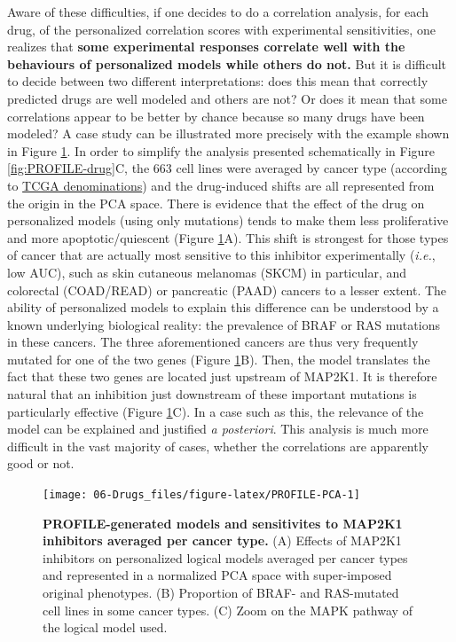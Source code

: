 \documentclass[a4paper,12pt,twoside,onecolumn,openright,final,oldfontcommands]{memoir}
\begin{document}
Aware of these difficulties, if one decides to do a correlation
analysis, for each drug, of the personalized correlation scores with
experimental sensitivities, one realizes that \textbf{some experimental
responses correlate well with the behaviours of personalized models
while others do not.} But it is difficult to decide between two
different interpretations: does this mean that correctly predicted drugs
are well modeled and others are not? Or does it mean that some
correlations appear to be better by chance because so many drugs have
been modeled? A case study can be illustrated more precisely with the
example shown in Figure \ref{fig:PROFILE-PCA}. In order to simplify the
analysis presented schematically in Figure \ref{fig:PROFILE-drug}C, the
663 cell lines were averaged by cancer type (according to
\href{https://gdc.cancer.gov/resources-tcga-users/tcga-code-tables/tcga-study-abbreviations}{TCGA
denominations}) and the drug-induced shifts are all represented from the
origin in the PCA space. There is evidence that the effect of the drug
on personalized models (using only mutations) tends to make them less
proliferative and more apoptotic/quiescent (Figure
\ref{fig:PROFILE-PCA}A). This shift is strongest for those types of
cancer that are actually most sensitive to this inhibitor experimentally
(\emph{i.e.}, low AUC), such as skin cutaneous melanomas (SKCM) in
particular, and colorectal (COAD/READ) or pancreatic (PAAD) cancers to a
lesser extent. The ability of personalized models to explain this
difference can be understood by a known underlying biological reality:
the prevalence of BRAF or RAS mutations in these cancers. The three
aforementioned cancers are thus very frequently mutated for one of the
two genes (Figure \ref{fig:PROFILE-PCA}B). Then, the model translates
the fact that these two genes are located just upstream of MAP2K1. It is
therefore natural that an inhibition just downstream of these important
mutations is particularly effective (Figure \ref{fig:PROFILE-PCA}C). In
a case such as this, the relevance of the model can be explained and
justified \emph{a posteriori}. This analysis is much more difficult in
the vast majority of cases, whether the correlations are apparently good
or not.

\begin{figure}

{\centering \texttt{[image: 06-Drugs\_files/figure-latex/PROFILE-PCA-1]} 

}

\caption[PROFILE-generated models and sensitivites to MAP2K1  inhibitors averaged per cancer type]{\textbf{PROFILE-generated models and
sensitivites to MAP2K1 inhibitors averaged per cancer type.} (A) Effects
of MAP2K1 inhibitors on personalized logical models averaged per cancer
types and represented in a normalized PCA space with super-imposed
original phenotypes. (B) Proportion of BRAF- and RAS-mutated cell lines
in some cancer types. (C) Zoom on the MAPK pathway of the logical model
used.}\label{fig:PROFILE-PCA}
\end{figure}
\end{document}
